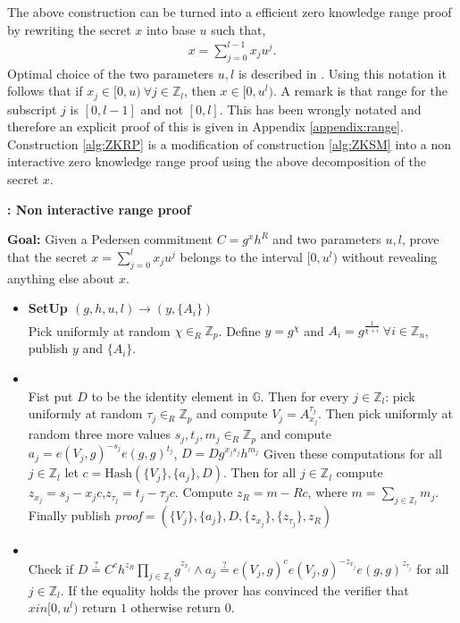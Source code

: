The above construction can be turned into a efficient zero knowledge range proof by rewriting the secret $x$ into base $u$ such that,
\begin{align*}
    x = \sum_{j=0}^{l-1} x_ju^j.
\end{align*}
Optimal choice of the two parameters $u,l$ is described in \cite{PR}. 
Using this notation it follows that if $x_j\in[0,u)\: \forall j\in\mathds{Z}_l$, then $x\in[0,u^l)$. A remark is that range for the subscript $j$ is $[0,l-1]$ and not $[0,l]$.  This has been wrongly notated \cite{RANGE-SET,ZKRP_Morais} and therefore an explicit proof of this is given in Appendix \ref{appendix:range}. Construction \ref{alg:ZKRP} is a modification of construction \ref{alg:ZKSM} into a non interactive zero knowledge range proof using the above decomposition of the secret $x$.

\begin{algorithm}[]
\caption{\textbf{: Non interactive range proof}}
\textbf{Goal:} Given a Pedersen commitment $C=g^x h^R$ and two parameters $u,l$, prove that the secret $x=\sum_{j=0}^l x_j u^j$ belongs to the interval $[0,u^l)$ without revealing anything else about $x$.
\vspace{2pt}
\hline
\vspace{2pt}
\begin{itemize}
  \item\textbf{SetUp $(g,h,u,l)\xrightarrow[]{}(y,\{A_{i}\})$}\\
Pick uniformly at random $\chi\in_R\mathds{Z}_p$. Define $y=g^\chi$ and $A_i=g^{\frac{1}{\chi+i}} \: \forall i\in\mathds{Z}_u$, publish $y$ and $\{A_i\}$.

\item{}\\
Fist put $D$ to be the identity element in $\mathds{G}$. Then for every $j\in\mathds{Z}_l$: pick uniformly at random $\tau_j\in_R\mathds{Z}_p$ and compute $V_j=A_{x_j}^{\tau_j}$. Then pick uniformly at random three more values $s_j,t_j,m_j\in_R\mathds{Z}_p$ and compute $a_j=e(V_j,g)^{-s_j}e(g,g)^{t_j}$, $D=Dg^{x_js_j}h^{m_j}$ Given these computations for all $j\in\mathds{Z}_l$ let $c=\text{Hash}(\{V_j\},\{a_j\},D)$. Then for all $j\in\mathds{Z}_l$ compute $z_{x_j}=s_j-x_jc$,$z_{\tau_j}=t_j-\tau_jc$. Compute $z_R=m-Rc$, where $m=\sum_{j\in\mathds{Z}_l}m_j$. Finally publish \textit{proof}$=(\{V_j\},\{a_j\},D,\{z_{x_j}\},\{z_{\tau_j}\},z_R)$ 

\item{}\\
Check if $D\overset{?}{=}C^ch^{z_R}\prod_{j\in\mathds{Z}_l}g^{z_{x_j}}\wedge a_j \overset{?}{=} e(V_j,g)^c e(V_j,g)^{-z_{x_j}}e(g,g)^{z_{\tau_j}}$ for all $j\in\mathds{Z}_l$.  If the equality holds the prover has convinced the verifier that $xin [0,u^l)$ return $1$ otherwise return $0$.
\end{itemize}
\label{alg:ZKRP}
\end{algorithm}

